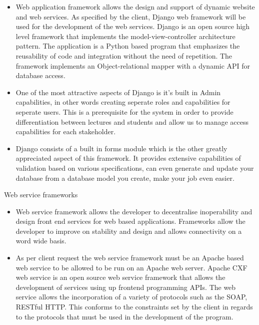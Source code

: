 \documentclass[12pt]{article}
\begin{document}
							\begin{itemize}
								\item Web application framework allows the design and support of dynamic website and web services. As specified by the client, Django web framework will be used for the development of the web services. Django is an open source high level framework that implements the model-view-controller architecture pattern. The application is a Python based program that emphasizes the reusability of code and integration without the need of repetition. The framework implements an Object-relational mapper with a dynamic API for database access.
								\item One of the most attractive aspects of Django is it's built in Admin capabilities, in other words creating seperate roles and capabilities for seperate users. This is a prerequisite for the system in order to provide differentiation between lectures and students and allow us to manage access capabilities for each stakeholder. 
								\item Django consists of a built in forms module which is the other greatly appreciated aspect of this framework. It provides extensive capabilities of validation based on various specifications, can even generate and update your database from a database model you create, make your job even easier.
							\end{itemize}
							 Web service frameworks
							\begin{itemize}
							\item Web service framework allows the developer to decentralise inoperability and design front end services for web based applications. Frameworks allow the developer to improve on stability and design and allows connectivity on a word wide basis.
							\item As per client request the web service framework must be an Apache based web service to be allowed to be run on an Apache web server. Apache CXF web service is an open source web service framework that allows the development of services using up frontend programming APIs. The web service allows the incorporation of a variety of protocols such as the SOAP, RESTful HTTP. This conforms to the constraints set by the client in regards to the protocols that must be used in the development of the program.
							
							\end{itemize}
					\vspace{0.2in}	
			
		
\end{document}
